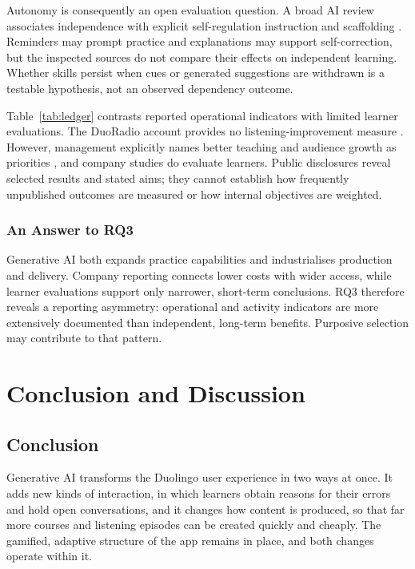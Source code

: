 \documentclass[11pt,titlepage]{article}
\begin{document}
Autonomy is consequently an open evaluation question. A broad AI review associates independence with explicit self-regulation instruction and scaffolding \parencite{mohebbi2025}. Reminders may prompt practice and explanations may support self-correction, but the inspected sources do not compare their effects on independent learning. Whether skills persist when cues or generated suggestions are withdrawn is a testable hypothesis, not an observed dependency outcome.

Table~\ref{tab:ledger} contrasts reported operational indicators with limited learner evaluations. The DuoRadio account provides no listening-improvement measure \parencite{duoradio}. However, management explicitly names better teaching and audience growth as priorities \parencite[letter p.~4]{shareholderQ12026}, and company studies do evaluate learners. Public disclosures reveal selected results and stated aims; they cannot establish how frequently unpublished outcomes are measured or how internal objectives are weighted.

\subsubsection{An Answer to RQ3}
Generative AI both expands practice capabilities and industrialises production and delivery. Company reporting connects lower costs with wider access, while learner evaluations support only narrower, short-term conclusions. RQ3 therefore reveals a reporting asymmetry: operational and activity indicators are more extensively documented than independent, long-term benefits. Purposive selection may contribute to that pattern.

\clearpage
\section{Conclusion and Discussion}
\label{sec:conclusion-discussion}
\subsection{Conclusion}
Generative AI transforms the Duolingo user experience in two ways at once. It adds new kinds of interaction, in which learners obtain reasons for their errors and hold open conversations, and it changes how content is produced, so that far more courses and listening episodes can be created quickly and cheaply. The gamified, adaptive structure of the app remains in place, and both changes operate within it.
\end{document}
